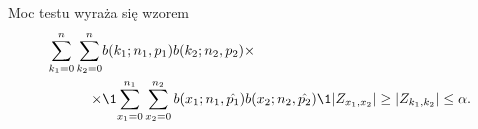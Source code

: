 Moc testu wyraża się wzorem
\begin{equation}
\begin{split}
\sum_{k_1=0}^{n}\sum_{k_2=0}^{n}& b(k_1;n_1,p_1)b(k_2;n_2,p_2) \times \\
\times &\1{\sum_{x_1=0}^{n_1} \sum_{x_2=0}^{n_2} b(x_1;n_1,\hat{p_1}) b(x_2;n_2,\hat{p_2}) \1{|Z_{x_1,x_2}|\geq|Z_{k_1,k_2}|} \leq\alpha}.
\end{split}
\end{equation}


